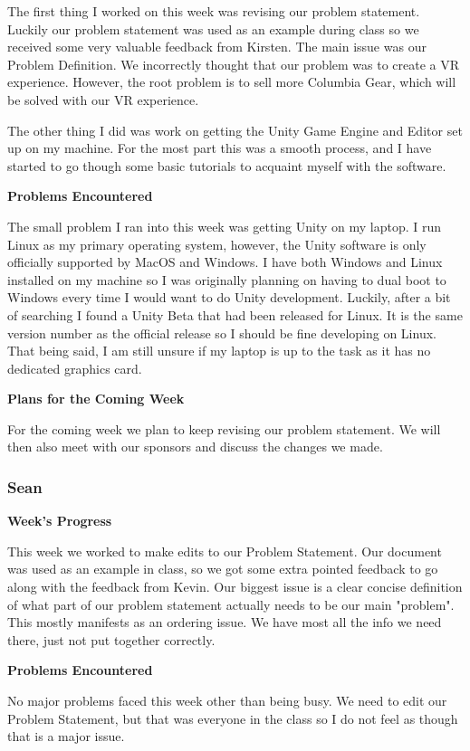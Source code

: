 \documentclass[10pt,journal,compsoc,onecolumn, draftclsnofoot]{IEEEtran}
\begin{document}
The first thing I worked on this week was revising our problem statement. Luckily our problem statement was used as an example during class so we received some very valuable feedback from Kirsten. The main issue was our Problem Definition. We incorrectly thought that our problem was to create a VR experience. However, the root problem is to sell more Columbia Gear, which will be solved with our VR experience.

The other thing I did was work on getting the Unity Game Engine and Editor set up on my machine. For the most part this was a smooth process, and I have started to go though some basic tutorials to acquaint myself with the software.

\noindent \textbf{Problems Encountered}

The small problem I ran into this week was getting Unity on my laptop. I run Linux as my primary operating system, however, the Unity software is only officially supported by MacOS and Windows. I have both Windows and Linux installed on my machine so I was originally planning on having to dual boot to Windows every time I would want to do Unity development. Luckily, after a bit of searching I found a Unity Beta that had been released for Linux. It is the same version number as the official release so I should be fine developing on Linux. That being said, I am still unsure if my laptop is up to the task as it has no dedicated graphics card.

\noindent \textbf{Plans for the Coming Week}

For the coming week we plan to keep revising our problem statement. We will then also meet with our sponsors and discuss the changes we made.

\subsubsection{Sean}
\noindent \textbf{Week's Progress}

This week we worked to make edits to our Problem Statement.  Our document was used as an example in class, so we got some extra pointed feedback to go along with the feedback from Kevin.  Our biggest issue is a clear concise definition of what part of our problem statement actually needs to be our main "problem".  This mostly manifests as an ordering issue.  We have most all the info we need there, just not put together correctly.

\noindent \textbf{Problems Encountered}

No major problems faced this week other than being busy.  We need to edit our Problem Statement, but that was everyone in the class so I do not feel as though that is a major issue.
\end{document}
